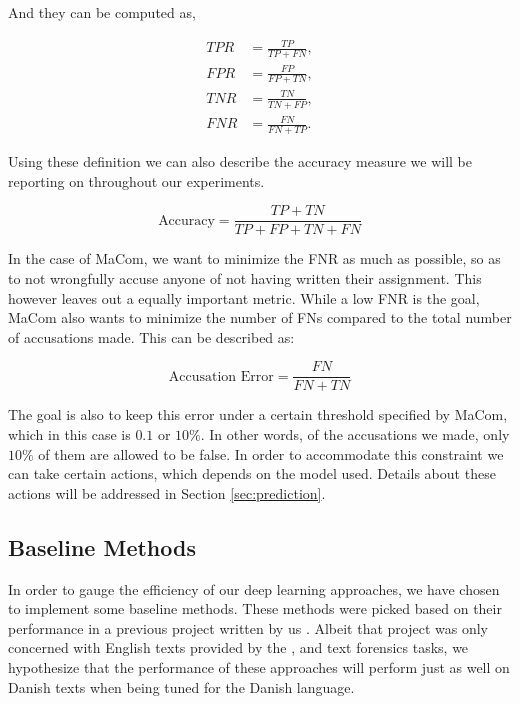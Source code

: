 And they can be computed as,

\begin{align}
    TPR &= \frac{TP}{TP + FN}, \\
    FPR &= \frac{FP}{FP + TN}, \\
    TNR &= \frac{TN}{TN + FP}, \\
    FNR &= \frac{FN}{FN + TP}.
\end{align}

Using these definition we can also describe the accuracy measure we will be
reporting on throughout our experiments.

\begin{equation}
    \text{Accuracy} = \frac{TP + TN}{TP + FP + TN + FN}
\end{equation}


In the case of MaCom, we want to minimize the \gls{FNR} as much as possible, so
as to not wrongfully accuse anyone of not having written their assignment.
This however leaves out a equally important metric. While a low \gls{FNR}
is the goal, MaCom also wants to minimize the number of \gls{FN}s compared
to the total number of accusations made. This can be described as:

\begin{equation}
    \text{Accusation Error} = \frac{FN}{FN + TN}
\end{equation}

The goal is also to keep this error under a certain threshold specified
by MaCom, which in this case is $0.1$ or $10\%$. In other words, of the
accusations we made, only $10\%$ of them are allowed to be false. In order
to accommodate this constraint we can take certain actions, which depends on
the model used. Details about these actions will be addressed in Section
\ref{sec:prediction}.

\subsection{Baseline Methods}

In order to gauge the efficiency of our deep learning approaches, we have chosen
to implement some baseline methods. These methods were picked based on their
performance in a previous project written by us \cite{US}. Albeit that project
was only concerned with English texts provided by the \cite{pan:2015}, and
\cite{pan:2014} text forensics tasks, we hypothesize that the performance of
these approaches will perform just as well on Danish texts when being tuned for
the Danish language.


